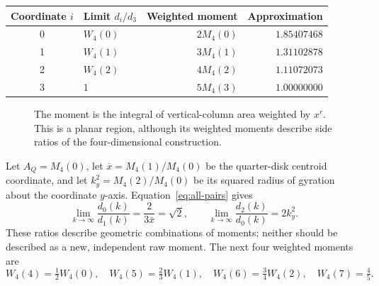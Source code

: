 \documentclass[11pt]{article}
\numberwithin{equation}{section}
\theoremstyle{remark}
\newcommand{\dd}{\,\mathrm{d}}
\begin{document}
\begin{center}
\begin{tabular}{@{}clrr@{}}
\toprule
Coordinate $i$ & Limit $d_i/d_3$ & Weighted moment & Approximation\\
\midrule
0 & $W_4(0)$ & $2M_4(0)$ & $1.85407468$\\
1 & $W_4(1)$ & $3M_4(1)$ & $1.31102878$\\
2 & $W_4(2)$ & $4M_4(2)$ & $1.11072073$\\
3 & $1$      & $5M_4(3)$ & $1.00000000$\\
\bottomrule
\end{tabular}
\end{center}

\begin{figure}[htbp]
\centering
{}
\caption{The moment is the integral of vertical-column area weighted by
$x^r$. This is a planar region, although its weighted moments describe
side ratios of the four-dimensional construction.}
\label{fig:moment}
\end{figure}

Let $A_Q=M_4(0)$, let $\bar{x}=M_4(1)/M_4(0)$ be the
quarter-disk centroid coordinate, and let
$k_y^2=M_4(2)/M_4(0)$ be its squared radius of gyration about
the coordinate $y$-axis. Equation~\eqref{eq:all-pairs} gives
\[
  \lim_{k\to\infty}\frac{d_0(k)}{d_1(k)}
       =\frac{2}{3\bar{x}}=\sqrt{2},
  \qquad
  \lim_{k\to\infty}\frac{d_2(k)}{d_0(k)}=2k_y^2.
\]
These ratios describe geometric combinations of moments; neither
should be described as a new, independent raw moment.
The next four weighted moments are
\[
  W_4(4)=\tfrac12 W_4(0),\quad
  W_4(5)=\tfrac23 W_4(1),\quad
  W_4(6)=\tfrac34 W_4(2),\quad
  W_4(7)=\tfrac45.
\]
\end{document}
